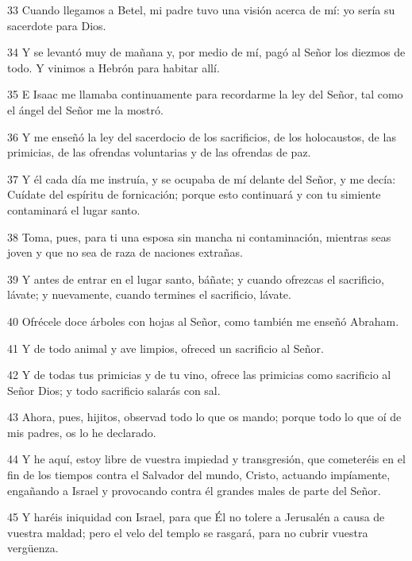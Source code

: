 \par 33 Cuando llegamos a Betel, mi padre tuvo una visión acerca de mí: yo sería su sacerdote para Dios.

\par 34 Y se levantó muy de mañana y, por medio de mí, pagó al Señor los diezmos de todo. Y vinimos a Hebrón para habitar allí.

\par 35 E Isaac me llamaba continuamente para recordarme la ley del Señor, tal como el ángel del Señor me la mostró.

\par 36 Y me enseñó la ley del sacerdocio de los sacrificios, de los holocaustos, de las primicias, de las ofrendas voluntarias y de las ofrendas de paz.

\par 37 Y él cada día me instruía, y se ocupaba de mí delante del Señor, y me decía: Cuídate del espíritu de fornicación; porque esto continuará y con tu simiente contaminará el lugar santo.

\par 38 Toma, pues, para ti una esposa sin mancha ni contaminación, mientras seas joven y que no sea de raza de naciones extrañas.

\par 39 Y antes de entrar en el lugar santo, báñate; y cuando ofrezcas el sacrificio, lávate; y nuevamente, cuando termines el sacrificio, lávate.

\par 40 Ofrécele doce árboles con hojas al Señor, como también me enseñó Abraham.

\par 41 Y de todo animal y ave limpios, ofreced un sacrificio al Señor.

\par 42 Y de todas tus primicias y de tu vino, ofrece las primicias como sacrificio al Señor Dios; y todo sacrificio salarás con sal.

\par 43 Ahora, pues, hijitos, observad todo lo que os mando; porque todo lo que oí de mis padres, os lo he declarado.

\par 44 Y he aquí, estoy libre de vuestra impiedad y transgresión, que cometeréis en el fin de los tiempos contra el Salvador del mundo, Cristo, actuando impíamente, engañando a Israel y provocando contra él grandes males de parte del Señor.

\par 45 Y haréis iniquidad con Israel, para que Él no tolere a Jerusalén a causa de vuestra maldad; pero el velo del templo se rasgará, para no cubrir vuestra vergüenza.

